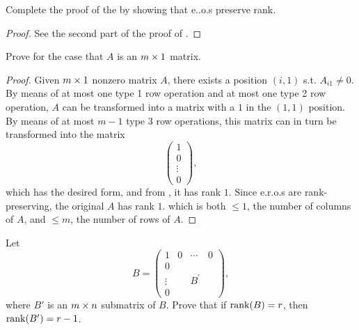 \begin{exercise} \label{exercise 3.2.9}
Complete the proof of the  by showing that e..o.s preserve rank.
\end{exercise}

\begin{proof}
See the second part of the proof of .
\end{proof}

\begin{exercise} \label{exercise 3.2.10}
Prove  for the case that \(A\) is an \(m \times 1\) matrix.
\end{exercise}

\begin{proof}
Given \(m \times 1\) nonzero matrix \(A\), there exists a position \((i, 1)\) s.t. \(A_{i1} \ne 0\).
By means of at most one type 1 row operation and at most one type 2 row operation, \(A\) can be transformed into a matrix with a \(1\) in the \((1, 1)\) position.
By means of at most \(m - 1\) type 3 row operations, this matrix can in turn be transformed into the matrix
\[
\begin{pmatrix} 1 \\ 0 \\ \vdots \\ 0 \end{pmatrix},
\]
which has the desired form, and from , it has rank \(1\).
Since e.r.o.s are rank-preserving, the original \(A\) has rank \(1\). which is both \(\le 1\), the number of columns of \(A\), and \(\le m\), the number of rows of \(A\).
\end{proof}

\begin{exercise} \label{exercise 3.2.11}
Let
\[
    B = \left(\begin{array}{c|ccc}
        1 & 0 & \cdots & 0 \\
        \hline 0 & & & \\
        \vdots & & B^{\prime} & \\
        0 & & &
    \end{array}\right),
\]
where \(B'\) is an \(m \times n\) submatrix of \(B\).
Prove that if \(\mathrm{rank}(B) = r\), then \(\mathrm{rank}(B') = r - 1\).
\end{exercise}

